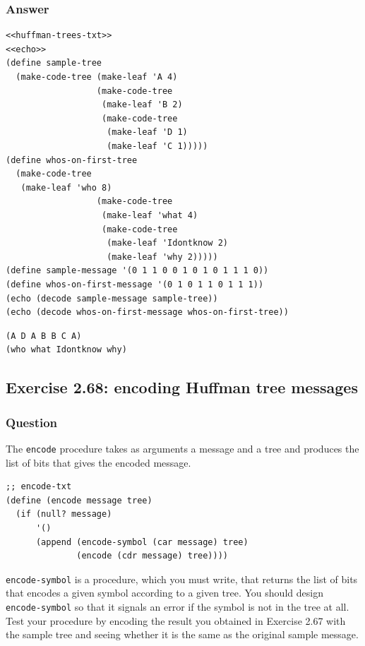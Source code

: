 \documentclass[final,fleqn,titlepage,twoside]{article}
\begin{document}
\subsubsection{Answer}
\label{sec:orgfa95ac4}
\begin{verbatim}
<<huffman-trees-txt>>
<<echo>>
(define sample-tree
  (make-code-tree (make-leaf 'A 4)
                  (make-code-tree
                   (make-leaf 'B 2)
                   (make-code-tree
                    (make-leaf 'D 1)
                    (make-leaf 'C 1)))))
(define whos-on-first-tree
  (make-code-tree
   (make-leaf 'who 8)
                  (make-code-tree
                   (make-leaf 'what 4)
                   (make-code-tree
                    (make-leaf 'Idontknow 2)
                    (make-leaf 'why 2)))))
(define sample-message '(0 1 1 0 0 1 0 1 0 1 1 1 0))
(define whos-on-first-message '(0 1 0 1 1 0 1 1 1))
(echo (decode sample-message sample-tree))
(echo (decode whos-on-first-message whos-on-first-tree))
\end{verbatim}

\begin{verbatim}
(A D A B B C A) 
(who what Idontknow why) 
\end{verbatim}

\subsection{Exercise 2.68: encoding Huffman tree messages}
\label{sec:orgcf92bd5}
\subsubsection{Question}
\label{sec:orgf8cbc91}
The \texttt{encode} procedure takes as arguments a message and a tree and
produces the list of bits that gives the encoded message.

\begin{verbatim}
;; encode-txt
(define (encode message tree)
  (if (null? message)
      '()
      (append (encode-symbol (car message) tree)
              (encode (cdr message) tree))))
\end{verbatim}

\texttt{encode-symbol} is a procedure, which you must write, that returns the
list of bits that encodes a given symbol according to a given tree. You should
design \texttt{encode-symbol} so that it signals an error if the symbol is
not in the tree at all. Test your procedure by encoding the result you obtained
in Exercise 2.67 with the sample tree and seeing whether it is the same as the
original sample message.
\end{document}
